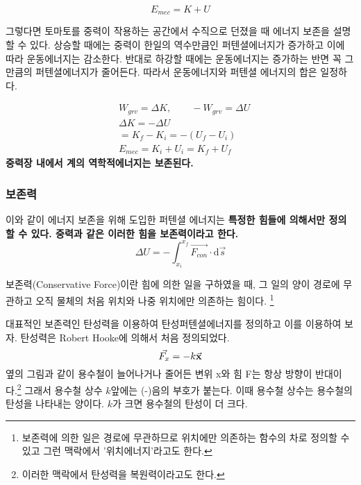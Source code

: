 \begin{flushleft}
\begin{equation}
  E_{mec} =K+U
\end{equation}
  

그렇다면 
토마토를 중력이 작용하는 공간에서 수직으로 던졌을 때 에너지 보존을 설명할 수 있다. 
상승할 때에는 중력이 한일의 역수만큼인 퍼텐셜에너지가 증가하고 이에 따라 운동에너지는 감소한다. 반대로 
하강할 때에는 운동에너지는 증가하는 반면 꼭 그만큼의 퍼텐셜에너지가 줄어든다. 따라서 운동에너지와 퍼텐셜 에너지의 합은 일정하다. 
\newpage

\begin{defn}
  \begin{align}
    & W_{grv}=\Delta K ,\qquad -W_{grv}= \Delta U \\
    & \Delta K = -\Delta U\\
    & =K_f-K_i= -(U_f-U_i)\\
    & E_{mec}=K_i+U_i=K_f+U_f
\end{align}
\centering
\textbf{중력장 내에서 계의 역학적에너지는 보존된다.}
\end{defn}

\subsubsection*{보존력}
이와 같이 에너지 보존을 위해 도입한 퍼텐셜 에너지는 \textbf{특정한 힘들에 의해서만 정의할 수 있다. 중력과 같은 이러한 힘을 보존력이라고 한다.} 
\begin{equation}
  \Delta U =-\int_{x_i}^{x_f} \vec{F_{con}} \cdot \textrm{d}\vec{s}
\end{equation}

보존력(Conservative Force)이란 힘에 의한 일을 구하였을 때, 그 일의 양이 경로에 무관하고 오직 물체의 처음 위치와 나중 위치에만 의존하는 힘이다. 
\footnote{보존력에 의한 일은 경로에 무관하므로 위치에만 의존하는 함수의 차로 정의할 수 있고 그런 맥락에서 '위치에너지'라고도 한다.}


\begin{task}
    \begin{flushleft}
  대표적인 보존력인 탄성력을 이용하여 탄성퍼텐셜에너지를 정의하고 이를 이용하여 보자. 탄성력은 Robert Hooke에 의해서 처음 정의되었다. 
  \begin{equation}
    \vec{F_x} = -k\va{x}
  \end{equation}
  옆의 그림과 같이 용수철이 늘어나거나 줄어든 변위 x와 힘 F는 항상 방향이 반대이다.\footnote{이러한 맥락에서 탄성력을 복원력이라고도 한다.}
  그래서 용수철 상수 $k$앞에는 (-)음의 부호가 붙는다. 
  이때 용수철 상수는 용수철의 탄성을 나타내는 양이다. $k$가 크면 용수철의 탄성이 더 크다. 


\end{flushleft}
\end{task}
\end{flushleft}
